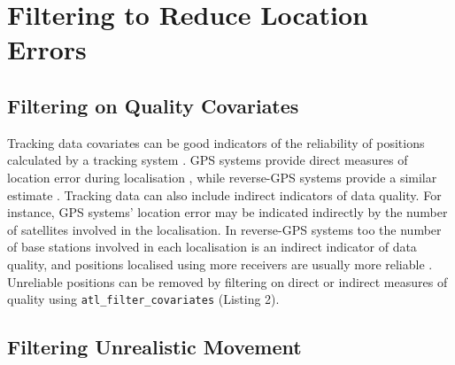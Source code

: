 \documentclass[10pt,paper=a4,headings=standardclasses
]{scrartcl}
\begin{document}
\section{Filtering to Reduce Location Errors}

\subsection{Filtering on Quality Covariates}

Tracking data covariates can be good indicators of the reliability of positions calculated by a tracking system \citep{beardsworth2021}.
GPS systems provide direct measures of location error during localisation \citep[Horizontal Dilution of Precision, HDOP in GPS]{ranacher2016}, while  reverse-GPS systems provide a similar estimate \citep[called Standard Deviation, SD][]{maccurdy2009, maccurdy2019, weiser2016, ranacher2016}.
Tracking data can also include indirect indicators of data quality.
For instance, GPS systems' location error may be indicated indirectly by the number of satellites involved in the localisation.
In reverse-GPS systems too the number of base stations involved in each localisation is an indirect indicator of data quality, and positions localised using more receivers are usually more reliable \citep[the minimum required for an ATLAS localisation is 3; see][]{weiser2016}.
Unreliable positions can be removed by filtering on direct or indirect measures of quality using \texttt{atl\_filter\_covariates} (Listing 2).

\subsection{Filtering Unrealistic Movement}
\end{document}
